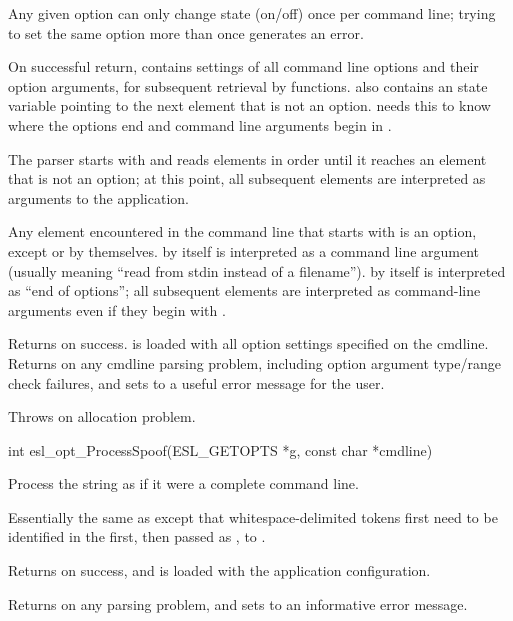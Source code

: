 \begin{sreapi}
Any given option can only change state (on/off) once
per command line; trying to set the same option more than
once generates an error.

On successful return,  contains settings of all
command line options and their option arguments, for
subsequent retrieval by 
functions.   also contains an  state variable
pointing to the next  element that is not an
option.  needs this to know
where the options end and command line arguments begin
in .

The parser starts with  and reads  elements
in order until it reaches an element that is not an option; 
at this point, all subsequent  elements are 
interpreted as arguments to the application.

Any  element encountered in the command line that
starts with \ccode{- } is an option, except \ccode{- } or \ccode{-- } by
themselves. \ccode{- } by itself is interpreted as a command
line argument (usually meaning ``read from stdin instead
of a filename''). \ccode{-- } by itself is interpreted as
``end of options''; all subsequent  elements are
interpreted as command-line arguments even if they
begin with \ccode{- }. 

Returns  on success.  is loaded with
all option settings specified on the cmdline.
Returns  on any cmdline parsing problem,
including option argument type/range check failures,
and sets  to a useful error message for
the user.

Throws  on allocation problem.           


\hypertarget{func:esl_opt_ProcessSpoof()}
{\item[int esl\_opt\_ProcessSpoof(ESL\_GETOPTS *g, const char *cmdline)]}

Process the string  as if it were a 
complete command line. 

Essentially the same as 
except that whitespace-delimited tokens first need to be
identified in the  first, then passed as
, to .

Returns  on success, and  is loaded with the
application configuration.

Returns  on any parsing problem, and sets
 to an informative error message.


\end{sreapi}
